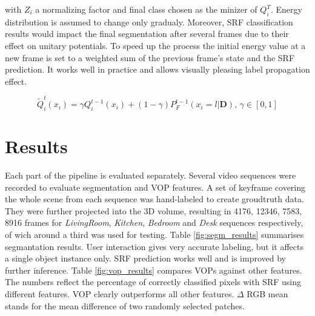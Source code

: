 \documentclass{llncs}
\begin{document}
with $Z_i$ a normalizing factor and final class chosen as the minizer of $Q_i^T$. Energy distribution is assumed to change only gradualy. Moreover, SRF classification results would impact the final segmentation after several frames due to their effect on unitary potentials. To speed up the process the initial energy value at a new frame is set to a weighted sum of the previous frame's state and the SRF prediction. It works well in practice and allows visually pleasing label propagation effect.

\begin{equation}
 \widetilde{Q}_i^t(x_i) = \gamma Q_i^{t-1}(x_i) + (1 - \gamma) P_F^{t-1}(x_i = l | \mathbf{D}) \text{, } \gamma \in [0, 1]
\end{equation}

% 

\section{Results}
  Each part of the pipeline is evaluated separately. Several video sequences were recorded to evaluate segmentation and VOP features. A set of keyframe covering the whole scene from each sequence was hand-labeled to create groudtruth data. They were further projected into the 3D volume, resulting in 4176, 12346, 7583, 8916 frames for \emph{LivingRoom}, \emph{Kitchen}, \emph{Bedroom} and \emph{Desk} sequences respectively, of wich around a third was used for testing. Table \ref{fig:segm_results} summarises segmantation results. User interaction gives very accurate labeling, but it affects a single object instance only. SRF prediction works well and is improved by further inference. Table \ref{fig:vop_results} compares VOPs against other features. The numbers reflect the percentage of correctly classified pixels with SRF using different features. VOP clearly outperforms all other features. $\Delta$ RGB mean stands for the mean difference of two randomly selected patches. 
  
\end{document}
